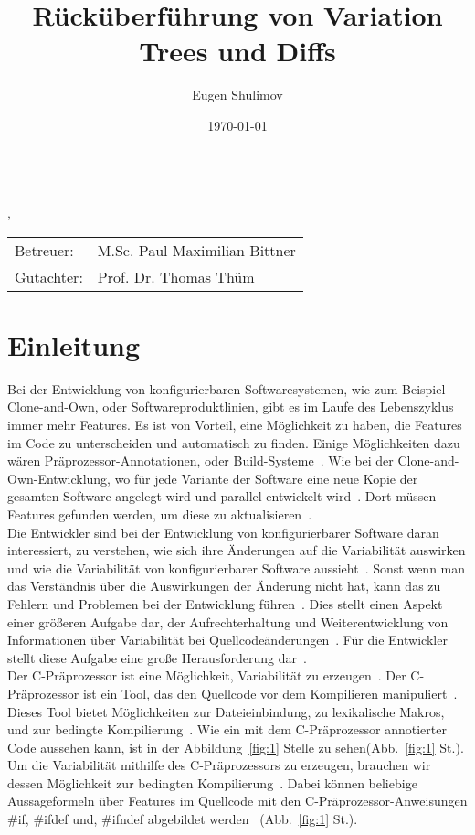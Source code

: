 \documentclass[11pt,a4paper,oneside]{article}
\title{Rücküberführung von Variation Trees und Diffs}
\author{Eugen Shulimov}
\date{\today}
\newcommand*\numcircledtikz[1]{\tikz[baseline=(char.base)]{
		\node[circle,draw,double,inner sep=1.2pt] (char) {#1};}}
\begin{document}
	\makeatletter
	\begin{center}
		{\large\@title}\\
		\@author, \@date
	\end{center}
	\makeatother
	\vspace*{10pt}
	\begin{tabular}{ll}
		Betreuer:& M.Sc. Paul Maximilian Bittner\\
		Gutachter:& Prof. Dr. Thomas Thüm
	\end{tabular}

	\vspace{20pt}
	\section{Einleitung}
	Bei der Entwicklung von konfigurierbaren Softwaresystemen, wie zum Beispiel Clone-and-Own, oder Softwareproduktlinien, gibt es im Laufe des Lebenszyklus immer mehr Features. Es ist von Vorteil, eine Möglichkeit zu haben, die Features im Code zu unterscheiden und automatisch zu finden. Einige Möglichkeiten dazu wären Präprozessor-Annotationen, oder Build-Systeme~\cite{ABKS13}. Wie bei der Clone-and-Own-Entwicklung, wo für jede Variante der Software eine neue Kopie der gesamten Software angelegt wird und parallel entwickelt wird~\cite{BTS+:ESECFSE22}. Dort müssen Features gefunden werden, um diese zu aktualisieren~\cite{BTS+:ESECFSE22,KTSB:ICSE21,KB:VaMoS20,KB:ESECFSE20,KKK+:SPLC18,ZSL+:ICSE18}.\\
	
	
	
	Die Entwickler sind bei der Entwicklung von konfigurierbarer Software daran interessiert, zu verstehen, wie sich ihre Änderungen auf die Variabilität auswirken und wie die Variabilität von konfigurierbarer Software aussieht~\cite{BTS+:ESECFSE22}. Sonst wenn man das Verständnis über die Auswirkungen der Änderung nicht hat, kann das zu Fehlern und Problemen bei der Entwicklung führen~\cite{BTS+:ESECFSE22,NBA+:JSS15, NST+:SoSyM22,SBT:JSS19, SNB+:VaMoS21,KATS:TOSEM12}. Dies stellt einen Aspekt einer größeren Aufgabe dar, der Aufrechterhaltung und Weiterentwicklung von Informationen über Variabilität bei Quellcodeänderungen~\cite{BTS+:ESECFSE22}. Für die Entwickler stellt diese Aufgabe eine große Herausforderung dar~\cite{BTS+:ESECFSE22,PCA+:VAMOS13, PTD+:EMSE16, SHA:SPLC12}.\\
	
	
	Der C-Präprozessor ist eine Möglichkeit, Variabilität zu erzeugen~\cite{ABKS13}. Der C-Präprozessor ist ein Tool, das den Quellcode vor dem Kompilieren manipuliert~\cite{ABKS13}. Dieses Tool bietet Möglichkeiten zur Dateieinbindung, zu lexikalische Makros, und zur bedingte Kompilierung~\cite{ABKS13}. Wie ein mit dem  C-Präprozessor annotierter Code aussehen kann, ist in der Abbildung~\ref{fig:1} Stelle \numcircledtikz{v} zu sehen(Abb.~\ref{fig:1} St.\numcircledtikz{v}). Um die Variabilität mithilfe des C-Präprozessors zu erzeugen, brauchen wir dessen Möglichkeit zur bedingten Kompilierung~\cite{ABKS13}. Dabei können beliebige Aussageformeln über Features im Quellcode mit den C-Präprozessor-Anweisungen \#if, \#ifdef und, \#ifndef abgebildet werden~\cite{BTS+:ESECFSE22} (Abb.~\ref{fig:1} St.\numcircledtikz{v}).\\
	
\end{document}
